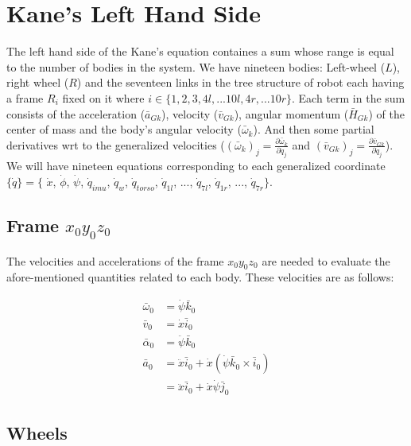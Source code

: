 \documentclass[a4paper,10pt]{article}
\begin{document}
\section{Kane's Left Hand Side}

The left hand side of the Kane's equation containes a sum whose range is equal to the number of bodies in the system. We have nineteen bodies: Left-wheel ($L$), right wheel ($R$) and the seventeen links in the tree structure of robot each having a frame $R_i$ fixed on it where $i \in \{ 1, 2, 3, 4l, ... 10l, 4r, ... 10r \}$. Each term in the sum consists of the acceleration ($\bar{a}_{Gk}$), velocity ($\bar{v}_{Gk}$), angular momentum ($\bar{H}_{Gk}$) of the center of mass and the body's angular velocity ($\bar{\omega}_k$). And then some partial derivatives wrt to the generalized velocities ($(\bar{\omega}_k)_j=\frac{\partial \bar{\omega}_k}{\partial \dot{q}_j}$ and $(\bar{v}_{Gk})_j=\frac{\partial \bar{v}_{Gk}}{\partial \dot{q}_j}$). We will have nineteen equations corresponding to each generalized coordinate $\{\dot{q}\} = \{$ $\dot{x}$, $\dot{\phi}$, $\dot{\psi}$, $\dot{q}_{imu}$, $\dot{q}_{w}$, $\dot{q}_{torso}$, $\dot{q}_{1l}$, $...$, $\dot{q}_{7l}$, $\dot{q}_{1r}$, $...$, $\dot{q}_{7r} \}$.

\subsection{Frame $x_0y_0z_0$} \label{frame0}

The velocities and accelerations of the frame $x_0y_0z_0$ are needed to evaluate the afore-mentioned quantities related to each body. These velocities are as follows:

\begin{align}
 \bar\omega_0 &= \dot\psi\bar{k}_0 \\
 \bar{v}_0 &= \dot{x}\bar{i}_0 \\
 \bar\alpha_0 &= \ddot\psi\bar{k}_0 \\
 \bar{a}_0 &= \ddot{x}\bar{i}_0 + \dot{x}\left( \dot\psi\bar{k}_0 \times \bar{i}_0 \right) \nonumber \\
 &= \ddot{x}\bar{i}_0 + \dot{x}\dot\psi\bar{j}_0
\end{align}

\subsection{Wheels}
\end{document}
